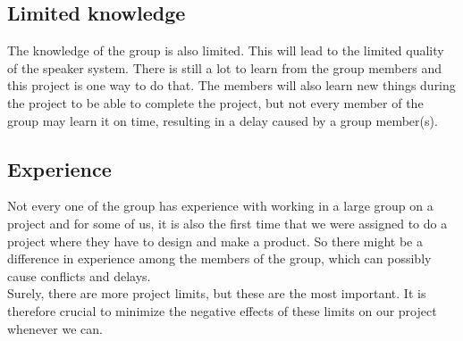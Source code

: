 \subsection{Limited knowledge}
The knowledge of the group is also limited. This will lead to the limited quality of the speaker system. There is still a lot to learn from the group members and this project is one way to do that. The members will also learn new things during the project to be able to complete the project, but not every member of the group may learn it on time, resulting in a delay caused by a group member(s).

\subsection{Experience}
Not every one of the group has experience with working in a large group on a project and for some of us, it is also the first time that we were assigned to do a project where they have to design and make a product. So there might be a difference in experience among the members of the group, which can possibly cause conflicts and delays.\\

Surely, there are more project limits, but these are the most important. It is therefore crucial to minimize the negative effects of these limits on our project whenever we can. 